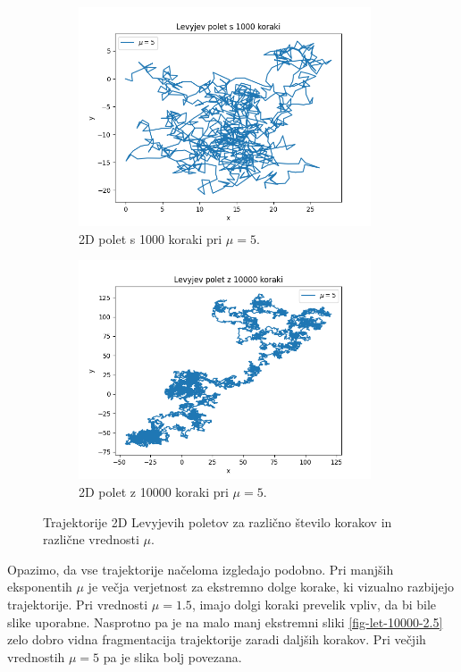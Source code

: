 \documentclass[a4paper, 12pt, slovene]{article}
\begin{document}
\begin{figure}[H]
\begin{subfigure}{0.49\textwidth}
	\includegraphics[width=0.95\textwidth]{sprehodi/let-1000-5.png}
	\caption{2D polet s 1000 koraki pri $\mu = 5$.}
	\label{fig-let-1000-5}
\end{subfigure}
\begin{subfigure}{0.49\textwidth}
	\centering
	\includegraphics[width=0.95\textwidth]{sprehodi/let-10000-5.png}
	\caption{2D polet z 10000 koraki pri $\mu = 5$.}
	\label{fig-let-10000-5}
\end{subfigure}

\caption{Trajektorije 2D Levyjevih poletov za različno število korakov in različne vrednosti $\mu$.}
\label{fig-leti}
\end{figure}

Opazimo, da vse trajektorije načeloma izgledajo podobno. Pri manjših eksponentih $\mu$ je večja verjetnost za ekstremno dolge korake, ki vizualno razbijejo trajektorije. Pri vrednosti $\mu = 1.5$, imajo dolgi koraki prevelik vpliv, da bi bile slike uporabne. Nasprotno pa je na malo manj ekstremni sliki \ref{fig-let-10000-2.5} zelo dobro vidna fragmentacija trajektorije zaradi daljših korakov. Pri večjih vrednostih $\mu=5$ pa je slika bolj povezana.
\end{document}
